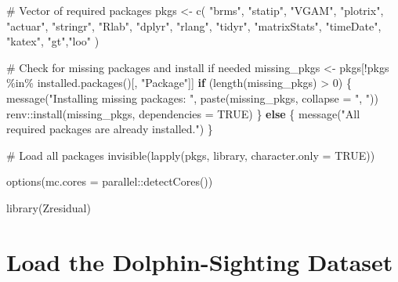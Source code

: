 \documentclass[
  english,
  letterpaper,
  DIV=11,
  numbers=noendperiod]{scrartcl}
\newenvironment{Shaded}{\begin{snugshade}}{\end{snugshade}}
\newcommand{\AttributeTok}[1]{\textcolor[rgb]{0.40,0.45,0.13}{#1}}
\newcommand{\CommentTok}[1]{\textcolor[rgb]{0.37,0.37,0.37}{#1}}
\newcommand{\ConstantTok}[1]{\textcolor[rgb]{0.56,0.35,0.01}{#1}}
\newcommand{\ControlFlowTok}[1]{\textcolor[rgb]{0.00,0.23,0.31}{\textbf{#1}}}
\newcommand{\DecValTok}[1]{\textcolor[rgb]{0.68,0.00,0.00}{#1}}
\newcommand{\FunctionTok}[1]{\textcolor[rgb]{0.28,0.35,0.67}{#1}}
\newcommand{\NormalTok}[1]{\textcolor[rgb]{0.00,0.23,0.31}{#1}}
\newcommand{\OtherTok}[1]{\textcolor[rgb]{0.00,0.23,0.31}{#1}}
\newcommand{\SpecialCharTok}[1]{\textcolor[rgb]{0.37,0.37,0.37}{#1}}
\newcommand{\StringTok}[1]{\textcolor[rgb]{0.13,0.47,0.30}{#1}}
\begin{document}
\begin{Shaded}
\begin{Highlighting}[]
\CommentTok{\# Vector of required packages}
\NormalTok{pkgs }\OtherTok{\textless{}{-}} \FunctionTok{c}\NormalTok{(}
  \StringTok{"brms"}\NormalTok{, }\StringTok{"statip"}\NormalTok{, }\StringTok{"VGAM"}\NormalTok{, }\StringTok{"plotrix"}\NormalTok{, }\StringTok{"actuar"}\NormalTok{,}
  \StringTok{"stringr"}\NormalTok{, }\StringTok{"Rlab"}\NormalTok{, }\StringTok{"dplyr"}\NormalTok{, }\StringTok{"rlang"}\NormalTok{, }\StringTok{"tidyr"}\NormalTok{,}
  \StringTok{"matrixStats"}\NormalTok{, }\StringTok{"timeDate"}\NormalTok{, }\StringTok{"katex"}\NormalTok{, }\StringTok{"gt"}\NormalTok{,}\StringTok{"loo"}
\NormalTok{)}

\CommentTok{\# Check for missing packages and install if needed}
\NormalTok{missing\_pkgs }\OtherTok{\textless{}{-}}\NormalTok{ pkgs[}\SpecialCharTok{!}\NormalTok{pkgs }\SpecialCharTok{\%in\%} \FunctionTok{installed.packages}\NormalTok{()[, }\StringTok{"Package"}\NormalTok{]]}
\ControlFlowTok{if}\NormalTok{ (}\FunctionTok{length}\NormalTok{(missing\_pkgs) }\SpecialCharTok{\textgreater{}} \DecValTok{0}\NormalTok{) \{}
  \FunctionTok{message}\NormalTok{(}\StringTok{"Installing missing packages: "}\NormalTok{, }\FunctionTok{paste}\NormalTok{(missing\_pkgs, }\AttributeTok{collapse =} \StringTok{", "}\NormalTok{))}
\NormalTok{  renv}\SpecialCharTok{::}\FunctionTok{install}\NormalTok{(missing\_pkgs, }\AttributeTok{dependencies =} \ConstantTok{TRUE}\NormalTok{)}
\NormalTok{\} }\ControlFlowTok{else}\NormalTok{ \{}
  \FunctionTok{message}\NormalTok{(}\StringTok{"All required packages are already installed."}\NormalTok{)}
\NormalTok{\}}

\CommentTok{\# Load all packages}
\FunctionTok{invisible}\NormalTok{(}\FunctionTok{lapply}\NormalTok{(pkgs, library, }\AttributeTok{character.only =} \ConstantTok{TRUE}\NormalTok{))}

\FunctionTok{options}\NormalTok{(}\AttributeTok{mc.cores =}\NormalTok{ parallel}\SpecialCharTok{::}\FunctionTok{detectCores}\NormalTok{())}

\FunctionTok{library}\NormalTok{(Zresidual)}
\end{Highlighting}
\end{Shaded}

\section{Load the Dolphin-Sighting
Dataset}\label{load-the-dolphin-sighting-dataset}
\end{document}
